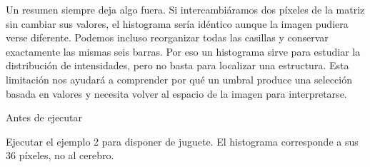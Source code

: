 Un resumen siempre deja algo fuera. Si intercambiáramos dos píxeles de la matriz sin cambiar sus valores, el histograma sería idéntico aunque la imagen pudiera verse diferente. Podemos incluso reorganizar todas las casillas y conservar exactamente las mismas seis barras. Por eso un histograma sirve para estudiar la distribución de intensidades, pero no basta para localizar una estructura. Esta limitación nos ayudará a comprender por qué un umbral produce una selección basada en valores y necesita volver al espacio de la imagen para interpretarse.



\begin{Idea}{Antes de ejecutar}

Ejecutar el ejemplo 2 para disponer de juguete. El histograma corresponde a sus 36 píxeles, no al cerebro.


\end{Idea}



